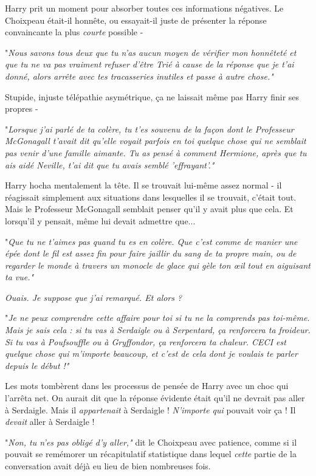 Harry prit un moment pour absorber toutes ces informations négatives. Le Choixpeau était-il honnête, ou essayait-il juste de présenter la réponse convaincante la plus \emph{courte}  possible -

"\emph{Nous savons tous deux que tu n'as aucun moyen de vérifier mon honnêteté et que tu ne va pas vraiment refuser d'être Trié à cause de la réponse que je t'ai donné, alors arrête avec tes tracasseries inutiles et passe à autre chose."} 

Stupide, injuste télépathie asymétrique, ça ne laissait même pas Harry finir ses propres -

"\emph{Lorsque j'ai parlé de ta colère, tu t'es souvenu de la façon dont le Professeur McGonagall t'avait dit qu'elle voyait parfois en toi quelque chose qui ne semblait pas venir d'une famille aimante. Tu as pensé à comment Hermione, après que tu ais aidé Neville, t'ai dit que tu avais semblé 'effrayant'."} 

Harry hocha mentalement la tête. Il se trouvait lui-même assez normal - il réagissait simplement aux situations dans lesquelles il se trouvait, c'était tout. Mais le Professeur McGonagall semblait penser qu'il y avait plus que cela. Et lorsqu'il y pensait, même lui devait admettre que...

"\emph{Que tu ne t'aimes pas quand tu es en colère. Que c'est comme de manier une épée dont le fil est assez fin pour faire jaillir du sang de ta propre main, ou de regarder le monde à travers un monocle de glace qui gèle ton œil tout en aiguisant ta vue."} 

\emph{Ouais. Je suppose que j'ai remarqué. Et alors ?} 

"\emph{Je ne peux comprendre cette affaire pour toi si tu ne la comprends pas toi-même. Mais je sais cela : si tu vas à Serdaigle ou à Serpentard, ça renforcera ta froideur. Si tu vas à Poufsouffle ou à Gryffondor, ça renforcera ta chaleur. CECI est quelque chose qui m'importe beaucoup, et c'est de cela dont je voulais te parler depuis le début !"} 

Les mots tombèrent dans les processus de pensée de Harry avec un choc qui l'arrêta net. On aurait dit que la réponse évidente était qu'il ne devrait pas aller à Serdaigle. Mais il \emph{appartenait}  à Serdaigle ! \emph{N'importe qui}  pouvait voir ça ! Il \emph{devait}  aller à Serdaigle !

"\emph{Non, tu n'es pas obligé d'y aller,"}  dit le Choixpeau avec patience, comme si il pouvait se remémorer un récapitulatif statistique dans lequel \emph{cette}  partie de la conversation avait déjà eu lieu de bien nombreuses fois.

